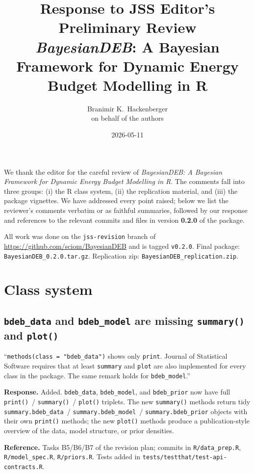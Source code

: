 \documentclass[11pt,a4paper]{article}
\title{Response to JSS Editor's Preliminary Review\\
\large \textit{BayesianDEB}: A Bayesian Framework for Dynamic Energy
Budget Modelling in R}
\author{Branimir K.\ Hackenberger\\ \small on behalf of the authors}
\date{2026-05-11}
\newcommand{\code}[1]{\texttt{#1}}
\begin{document}
\maketitle

We thank the editor for the careful review of \emph{BayesianDEB: A
Bayesian Framework for Dynamic Energy Budget Modelling in R}. The
comments fall into three groups: (i) the R class system, (ii) the
replication material, and (iii) the package vignettes. We have
addressed every point raised; below we list the reviewer's comments
verbatim or as faithful summaries, followed by our response and
references to the relevant commits and files in version \textbf{0.2.0}
of the package.

All work was done on the \code{jss-revision} branch of
\url{https://github.com/sciom/BayesianDEB} and is tagged \code{v0.2.0}.
Final package: \code{BayesianDEB\_0.2.0.tar.gz}. Replication zip:
\code{BayesianDEB\_replication.zip}.

\section{Class system}

\subsection{\code{bdeb\_data} and \code{bdeb\_model} are missing
\code{summary()} and \code{plot()}}

\begin{displayquote}
``\verb|methods(class = "bdeb_data")| shows only \code{print}.
Journal of Statistical Software requires that at least \code{summary}
and \code{plot} are also implemented for every class in the package.
The same remark holds for \code{bdeb\_model}.''
\end{displayquote}

\textbf{Response.} Added. \code{bdeb\_data}, \code{bdeb\_model}, and
\code{bdeb\_prior} now have full
\code{print()}~/ \code{summary()}~/ \code{plot()} triplets. The new
\code{summary()} methods return tidy \code{summary.bdeb\_data}~/
\code{summary.bdeb\_model}~/ \code{summary.bdeb\_prior} objects with
their own \code{print()} methods; the new \code{plot()} methods
produce a publication-style overview of the data, model structure, or
prior densities.

\textbf{Reference.} Tasks B5/B6/B7 of the revision plan; commits in
\code{R/data\_prep.R}, \code{R/model\_spec.R}, \code{R/priors.R}.
Tests added in \code{tests/testthat/test-api-contracts.R}.
\end{document}
